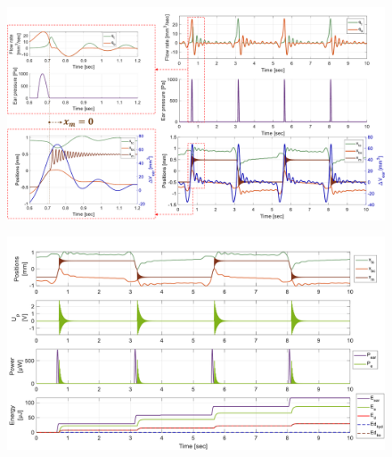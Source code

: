 \documentclass[3p,twocolumn,preprint]{elsarticle}
\begin{document}
\begin{figure}[!htbp]
	\centering
	\captionsetup{justification=centering}
	\includegraphics[trim={0cm 0cm 0cm 0.5cm},clip, width=\textwidth]{figures/positions+DeltaV_debits_pear.pdf}
	\caption{}
	\label{fig:positions+DeltaV_debits_pear}
\end{figure}
\begin{figure}[!htbp]
	\centering
	\captionsetup{justification=centering}
	\includegraphics[trim={0cm 0cm 0cm 1cm},clip, width=\textwidth]{figures/positions_Up_puissances_energies.pdf}
	\caption{}
	\label{fig:positions_Up_puissances_energies}
\end{figure}
\end{document}

